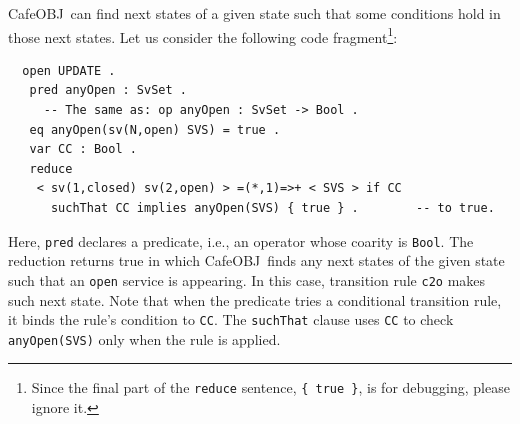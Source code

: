 \documentclass[12pt]{report}
\newcommand{\stt}[1]{{\small{\tt {#1}}}}
\newcommand{\cafeobj}{{\sf CafeOBJ}~}
\begin{document}
\cafeobj can find next states of a given state such that some
conditions hold in those next states. Let us consider the following
code fragment\footnote{Since the final part of the {\tt reduce} sentence,
  {\tt \{~true~\}}, is for debugging, please ignore it.}:
\small
\begin{verbatim}
  open UPDATE .
   pred anyOpen : SvSet .
     -- The same as: op anyOpen : SvSet -> Bool .
   eq anyOpen(sv(N,open) SVS) = true .
   var CC : Bool .
   reduce 
    < sv(1,closed) sv(2,open) > =(*,1)=>+ < SVS > if CC
      suchThat CC implies anyOpen(SVS) { true } .        -- to true.
\end{verbatim}
\normalsize
Here, {\tt pred} declares a predicate, i.e., an operator whose coarity
is {\tt Bool}.  The reduction returns true in which \cafeobj finds any
next states of the given state such that an {\tt open} service is
appearing. In this case, transition rule {\tt c2o} makes such next
state.  Note that when the predicate tries a conditional transition
rule, it binds the rule's condition to {\tt CC}. The {\tt suchThat}
clause uses {\tt CC} to check \stt{anyOpen(SVS)} only when the rule is
applied.
\end{document}
